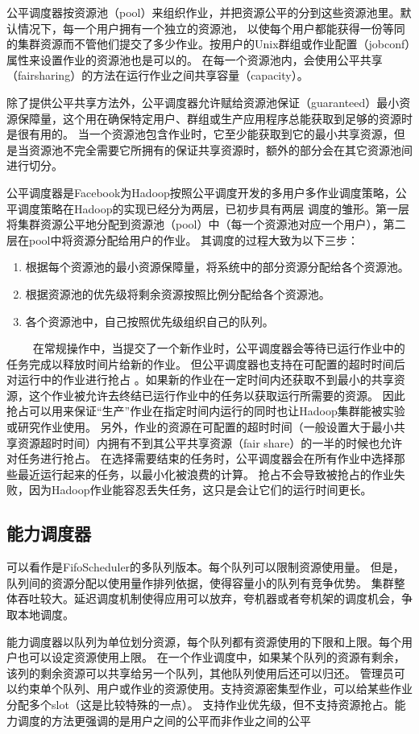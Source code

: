 公平调度器按资源池（pool）来组织作业，并把资源公平的分到这些资源池里。默认情况下，每一个用户拥有一个独立的资源池，
以使每个用户都能获得一份等同的集群资源而不管他们提交了多少作业。按用户的Unix群组或作业配置（jobconf）属性来设置作业的资源池也是可以的。
在每一个资源池内，会使用公平共享（fairsharing）的方法在运行作业之间共享容量（capacity）。

除了提供公平共享方法外，公平调度器允许赋给资源池保证（guaranteed）最小资源保障量，这个用在确保特定用户、群组或生产应用程序总能获取到足够的资源时是很有用的。
当一个资源池包含作业时，它至少能获取到它的最小共享资源，但是当资源池不完全需要它所拥有的保证共享资源时，额外的部分会在其它资源池间进行切分。

公平调度器是Facebook为Hadoop按照公平调度开发的多用户多作业调度策略，公平调度策略在Hadoop的实现已经分为两层，已初步具有两层
调度的雏形。第一层将集群资源公平地分配到资源池（pool）中（每一个资源池对应一个用户），第二层在pool中将资源分配给用户的作业。
其调度的过程大致为以下三步：
\begin{enumerate}
\item 根据每个资源池的最小资源保障量，将系统中的部分资源分配给各个资源池。
\item 根据资源池的优先级将剩余资源按照比例分配给各个资源池。
\item 各个资源池中，自己按照优先级组织自己的队列。
\end{enumerate}
　　
在常规操作中，当提交了一个新作业时，公平调度器会等待已运行作业中的任务完成以释放时间片给新的作业。
但公平调度器也支持在可配置的超时时间后对运行中的作业进行抢占
。如果新的作业在一定时间内还获取不到最小的共享资源，这个作业被允许去终结已运行作业中的任务以获取运行所需要的资源。
因此抢占可以用来保证“生产”作业在指定时间内运行的同时也让Hadoop集群能被实验或研究作业使用。
另外，作业的资源在可配置的超时时间（一般设置大于最小共享资源超时时间）内拥有不到其公平共享资源（fair share）的一半的时候也允许对任务进行抢占。
在选择需要结束的任务时，公平调度器会在所有作业中选择那些最近运行起来的任务，以最小化被浪费的计算。
抢占不会导致被抢占的作业失败，因为Hadoop作业能容忍丢失任务，这只是会让它们的运行时间更长。
\subsection{能力调度器}
可以看作是FifoScheduler的多队列版本。每个队列可以限制资源使用量。
但是，队列间的资源分配以使用量作排列依据，使得容量小的队列有竞争优势。
集群整体吞吐较大。延迟调度机制使得应用可以放弃，夸机器或者夸机架的调度机会，争取本地调度。

能力调度器以队列为单位划分资源，每个队列都有资源使用的下限和上限。每个用户也可以设定资源使用上限。
在一个作业调度中，如果某个队列的资源有剩余，该列的剩余资源可以共享给另一个队列，其他队列使用后还可以归还。
管理员可以约束单个队列、用户或作业的资源使用。支持资源密集型作业，可以给某些作业分配多个slot（这是比较特殊的一点）。
支持作业优先级，但不支持资源抢占。能力调度的方法更强调的是用户之间的公平而非作业之间的公平
